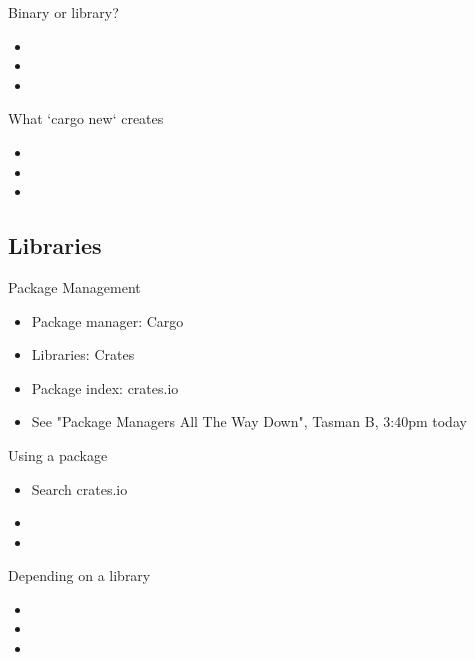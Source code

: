 \documentclass[xcolor={svgnames},hyperref]{beamer}
\begin{document}
    \begin{frame}
        Binary or library?
        \begin{itemize}
            \item
            \item
            \item
        \end{itemize}
    \end{frame}

    \begin{frame}
        What `cargo new` creates
        \begin{itemize}
            \item
            \item
            \item
        \end{itemize}
    \end{frame}


\subsection{Libraries }

    \begin{frame}
        Package Management
        \begin{itemize}
            \item Package manager: Cargo
            \item Libraries: Crates
            \item Package index: crates.io
            \item See "Package Managers All The Way Down", Tasman B, 3:40pm today
        \end{itemize}
    \end{frame}

    \begin{frame}
        Using a package
        \begin{itemize}
            \item Search crates.io
            \item
            \item
        \end{itemize}
    \end{frame}


    \begin{frame}
        Depending on a library
        \begin{itemize}
            \item
            \item
            \item
        \end{itemize}
    \end{frame}
\end{document}
